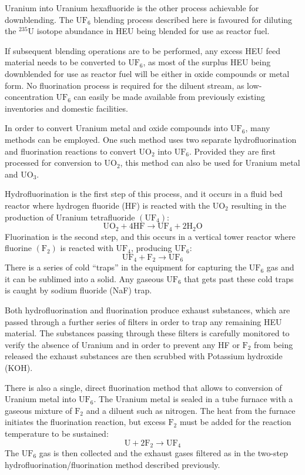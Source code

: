 \documentclass[twoside,titlepage,11pt,twocolumn,a4paper]{article}
\begin{document}
Uranium into Uranium hexafluoride is the other process achievable for
downblending.  The \(\mathrm{UF_6}\) blending process described here
is favoured for diluting the \( \mathrm{^{235}U} \) isotope abundance
in HEU being blended for use as reactor fuel.

If subsequent blending operations are to be performed, any excess HEU
feed material needs to be converted to \(\mathrm{UF_6}\), as most of
the surplus HEU being downblended for use as reactor fuel will be
either in oxide compounds or metal form. No fluorination process is
required for the diluent stream, as low-concentration
\(\mathrm{UF_6}\) can easily be made available from previously
existing inventories and domestic facilities.

In order to convert Uranium metal and oxide compounds into
\(\mathrm{UF_6}\), many methods can be employed. One such method
uses two separate hydrofluorination and fluorination
reactions to convert \(\mathrm{UO_2}\) into
\(\mathrm{UF_6}\). Provided they are first processed for conversion to
\(\mathrm{UO_2}\), this method can also be used for Uranium metal and
\(\mathrm{UO_3}\).

Hydrofluorination is the first step of this process, and it occurs in
a fluid bed reactor where hydrogen fluoride (HF) is reacted with the
\(\mathrm{UO_2}\) resulting in the production of Uranium tetrafluoride
\(\mathrm{(UF_4)}\):
\[ \mathrm{ UO_2 + 4HF \rightarrow UF_4 + 2 H_2O } \]
Fluorination is the second step, and this occurs in a vertical tower
reactor where fluorine \(\mathrm{(F_2)}\) is reacted with
\(\mathrm{UF_4}\), producing \(\mathrm{UF_6}\):
\[ \mathrm{ UF_4 + F_2 \rightarrow UF_6 } \]
There is a series of cold ``traps'' in the equipment for capturing the
\(\mathrm{UF_6}\) gas and it can be sublimed into a solid. Any gaseous
\(\mathrm{UF_6}\) that gets past these cold traps is caught by sodium
fluoride (NaF) trap.

Both hydrofluorination and fluorination produce exhaust substances,
which are passed through a further series of filters in order to trap
any remaining HEU material. The substances passing through these
filters is carefully monitored to verify the absence of Uranium and in
order to prevent any HF or \(\mathrm{F_2}\) from being released the
exhaust substances are then scrubbed with Potassium hydroxide (KOH).

There is also a single, direct fluorination method that allows to
conversion of Uranium metal into \(\mathrm{UF_6}\). The Uranium metal
is sealed in a tube furnace with a gaseous mixture of \(\mathrm{F_2}\)
and a diluent such as nitrogen. The heat from the furnace initiates
the fluorination reaction, but excess \(\mathrm{F_2}\) must be added
for the reaction temperature to be sustained:
\[ \mathrm{ U + 2F_2 \rightarrow UF_4 } \]
The \(\mathrm{UF_6}\) gas is then collected and the exhaust gases
filtered as in the two-step hydrofluorination/fluorination method
described previously. \citep{dilutingUranium}
\end{document}
